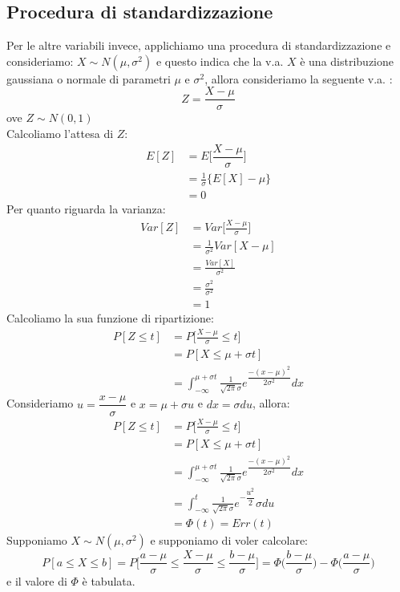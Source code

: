 \documentclass[12pt]{report}
\begin{document}
	 \subsection{Procedura di standardizzazione}
	 Per le altre variabili invece, applichiamo una procedura di standardizzazione e consideriamo: $X \sim N(\mu, \sigma^2)$ e questo indica che la v.a. $X$ è una distribuzione gaussiana o normale di parametri $\mu$ e $\sigma^2$, allora consideriamo la seguente v.a. :
	 \[
	 Z = \dfrac{X - \mu}{\sigma}
	 \]
	 ove $Z \sim N(0, 1)$ \\
	 Calcoliamo l'attesa di $Z$:
	 \begin{align*}
	 	E[Z] &= E\Bigg[\dfrac{X - \mu}{\sigma}\Bigg] \\
	 	&= \frac{1}{\sigma}\{E[X] - \mu\}\\
	 	&= 0
	 \end{align*}
	 Per quanto riguarda la varianza:
	 \begin{align*}
	 	Var[Z] &= Var\Bigg[\frac{X - \mu}{\sigma}\Bigg] \\
	 	&= \frac{1}{\sigma^2}Var[X - \mu] \\
	 	&= \frac{Var[X]}{\sigma^2} \\
	 	&= \frac{\sigma^2}{\sigma^2} \\
	 	&= 1
	 \end{align*}
	 Calcoliamo la sua funzione di ripartizione:
	 \begin{align*}
	 	P[Z \leq t] &= P\Bigg[\frac{X - \mu}{\sigma} \leq t\Bigg] \\
	 	&= P[X\leq \mu + \sigma t] \\
	 	&= \int_{-\infty}^{\mu + \sigma t}\frac{1}{\sqrt{2\pi}\sigma}e^{\dfrac{-(x - \mu)^2}{2\sigma^2}}dx
	 \end{align*}
	 Consideriamo $u = \dfrac{x - \mu}{\sigma}$ e $x = \mu + \sigma u$ e $dx = \sigma du$, allora:
	 \begin{align*}
	 	P[Z \leq t] &= P\Bigg[\frac{X - \mu}{\sigma} \leq t\Bigg] \\
	 	&= P[X\leq \mu + \sigma t] \\
	 	&= \int_{-\infty}^{\mu + \sigma t}\frac{1}{\sqrt{2\pi}\sigma} e^{\dfrac{-(x - \mu)^2}{2\sigma^2}}dx \\
	 	&= \int_{-\infty}^{t}\frac{1}{\sqrt{2\pi}\sigma}e^{-\dfrac{u^2}{2}} \sigma du \\
	 	&= \Phi(t) = Err(t)
	 \end{align*}
	 Supponiamo $X \sim N(\mu, \sigma^2)$ e supponiamo di voler calcolare:
	 \[
	 P[a \leq X \leq b] = P\Bigg[\frac{a - \mu}{\sigma} \leq \frac{X - \mu}{\sigma} \leq \frac{b - \mu}{\sigma}\Bigg] = \Phi\Bigg(\frac{b - \mu}{\sigma}\Bigg) - \Phi\Bigg(\frac{a - \mu}{\sigma}\Bigg)
	 \]
	 e il valore di $\Phi$ è tabulata.
\end{document}
